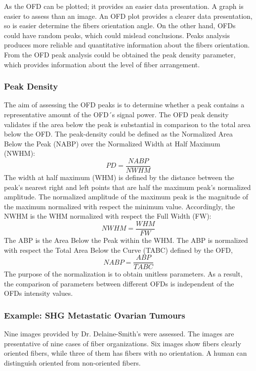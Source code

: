 \documentclass[12pt,a4paper]{article}
\begin{document}
As the OFD can be plotted; it provides an easier data presentation. A graph is easier to assess than an image.  An OFD plot provides a clearer data presentation, so is easier determine the fibers orientation angle. On the other hand, OFDs could have random peaks, which could mislead conclusions. Peaks analysis produces more reliable and quantitative information about the fibers orientation. From the  OFD peak analysis could be obtained the peak density parameter, which provides information about the level of fiber arrangement.

\subsubsection{Peak Density}

The aim of assessing the OFD peaks is to determine whether a peak contains a representative amount of the OFD´s signal power. The OFD peak density validates if the area below the peak is substantial in comparison to the total area below the OFD.  The peak-density  could be defined as the Normalized Area Below the Peak (NABP) over the Normalized Width at Half Maximum (NWHM):
\begin{equation}
PD=\frac{NABP}{NWHM}
\end{equation}
The width at half maximum (WHM) is defined by the distance between the peak's nearest right and left points that are half the maximum peak's normalized amplitude. The normalized amplitude of the maximum peak is the magnitude of the maximum normalized with respect the minimum value.  Accordingly, the NWHM is the WHM normalized with respect the Full Width (FW):
\begin{equation}
NWHM=\frac{WHM}{FW}
\end{equation}
The ABP is the Area Below the Peak within the WHM. The ABP is normalized with respect the Total Area Below the Curve (TABC) defined by the OFD,
\begin{equation}
NABP=\frac{ABP}{TABC}
\end{equation}
The purpose of the normalization is to obtain unitless parameters. As a result, the comparison of parameters between different OFDs is independent of the OFDs intensity values.

\subsubsection{Example: SHG Metastatic Ovarian Tumours}
Nine images provided by Dr. Delaine-Smith’s were assessed. The images are presentative of nine cases of fiber organizations. Six images show fibers clearly oriented fibers, while three of them has fibers with no orientation. A human can distinguish oriented from non-oriented fibers. 
\end{document}
